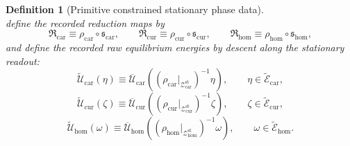 \documentclass[11pt]{article}
\newcommand{\TensorRawEqClass}{\widetilde{\mathscr E}_{\mathrm{car}}}
\newcommand{\CurRawEqClass}{\widetilde{\mathscr E}_{\mathrm{cur}}}
\newcommand{\HomRawEqClass}{\widetilde{\mathscr E}_{\mathrm{hom}}}
\newcommand{\TensorEqReduce}{\mathfrak R_{\mathrm{car}}}
\newcommand{\CurEqReduce}{\mathfrak R_{\mathrm{cur}}}
\newcommand{\HomEqReduce}{\mathfrak R_{\mathrm{hom}}}
\newcommand{\TensorRawEnergy}{\widetilde{\mathcal U}_{\mathrm{car}}}
\newcommand{\CurRawEnergy}{\widetilde{\mathcal U}_{\mathrm{cur}}}
\newcommand{\HomRawEnergy}{\widetilde{\mathcal U}_{\mathrm{hom}}}
\newcommand{\TensorPhaseRead}{\rho_{\mathrm{car}}}
\newcommand{\CurPhaseRead}{\rho_{\mathrm{cur}}}
\newcommand{\HomPhaseRead}{\rho_{\mathrm{hom}}}
\newcommand{\TensorPhaseEnergy}{\overline{\mathcal U}_{\mathrm{car}}}
\newcommand{\CurPhaseEnergy}{\overline{\mathcal U}_{\mathrm{cur}}}
\newcommand{\HomPhaseEnergy}{\overline{\mathcal U}_{\mathrm{hom}}}
\newcommand{\TensorStationaryManifold}{\mathcal Z_{\mathrm{car}}^{\mathrm{st}}}
\newcommand{\CurStationaryManifold}{\mathcal Z_{\mathrm{cur}}^{\mathrm{st}}}
\newcommand{\HomStationaryManifold}{\mathcal Z_{\mathrm{hom}}^{\mathrm{st}}}
\newcommand{\TensorStationarySolve}{\mathfrak s_{\mathrm{car}}}
\newcommand{\CurStationarySolve}{\mathfrak s_{\mathrm{cur}}}
\newcommand{\HomStationarySolve}{\mathfrak s_{\mathrm{hom}}}
\newtheorem{definition}{Definition}
\begin{document}
\begin{definition}[Primitive constrained stationary phase data]
\begin{equation}
\end{equation}
define the recorded reduction maps by
\begin{equation}
\TensorEqReduce\equiv\TensorPhaseRead\circ\TensorStationarySolve,\qquad
\CurEqReduce\equiv\CurPhaseRead\circ\CurStationarySolve,\qquad
\HomEqReduce\equiv\HomPhaseRead\circ\HomStationarySolve,
\label{eq:reduction_from_stationary_solve}
\end{equation}
and define the recorded raw equilibrium energies by descent along the stationary readout:
\begin{equation}
\TensorRawEnergy(\eta)
\equiv
\TensorPhaseEnergy\!\left(
\left(\TensorPhaseRead\big|_{\TensorStationaryManifold}\right)^{-1}\eta
\right),
\qquad
\eta\in\TensorRawEqClass,
\label{eq:raw_energy_from_phase_car}
\end{equation}
\begin{equation}
\CurRawEnergy(\zeta)
\equiv
\CurPhaseEnergy\!\left(
\left(\CurPhaseRead\big|_{\CurStationaryManifold}\right)^{-1}\zeta
\right),
\qquad
\zeta\in\CurRawEqClass,
\label{eq:raw_energy_from_phase_cur}
\end{equation}
\begin{equation}
\HomRawEnergy(\omega)
\equiv
\HomPhaseEnergy\!\left(
\left(\HomPhaseRead\big|_{\HomStationaryManifold}\right)^{-1}\omega
\right),
\qquad
\omega\in\HomRawEqClass.
\label{eq:raw_energy_from_phase_hom}
\end{equation}


\end{definition}
\end{document}
